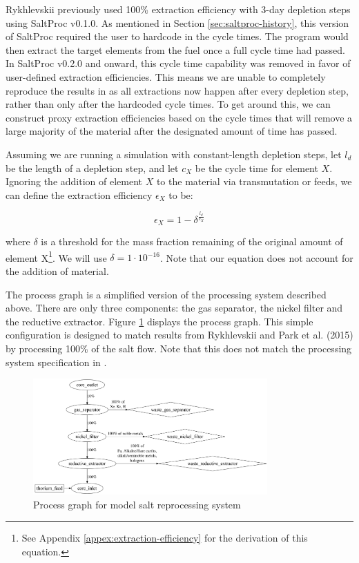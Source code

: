 Rykhlevskii previously used 100\% extraction efficiency with 3-day depletion
steps \cite{rykhlevskii_modeling_2019} using SaltProc v0.1.0. As mentioned in
Section \ref{sec:saltproc-history}, this version of SaltProc required the user
to hardcode in the cycle times. The program would then extract the target
elements from the fuel once a full cycle time had passed. In SaltProc v0.2.0 and
onward, this cycle time capability was removed in favor of user-defined
extraction efficiencies. This means we are unable to completely reproduce the
results in \cite{rykhlevskii_modeling_2019} as all extractions now happen after
every depletion step, rather than only after the hardcoded cycle times.
To get around this, we can construct proxy extraction efficiencies based on the
cycle times that will remove a large majority of the material after the
designated amount of time has passed.

Assuming we are running a simulation with constant-length depletion steps, let
$l_{d}$ be the length of a depletion step, and let $c_{X}$ be the cycle time for
element $X$. Ignoring the addition of element $X$ to the material via
transmutation or feeds, we can define the extraction efficiency $\epsilon_{X}$
to be:

\begin{equation}
    \label{eq:extraction-efficiency}
    \epsilon_{X} = 1 - \delta^{\frac{l_{d}}{c_{X}}}
\end{equation}

where $\delta$ is a threshold for the mass fraction remaining of the original
amount of element X\footnote{See Appendix \ref{appex:extraction-efficiency} for
the derivation of this equation.}. We will use $\delta = 1\cdot 10^{-16}$. Note
that our equation does not account for the addition of material.

The process graph is a simplified version of the processing system described 
above. There are only three components: the gas separator, the nickel filter and
the reductive extractor. Figure \ref{fig:process-graph} displays the process
graph. This simple configuration is designed to match results from Rykhlevskii
and Park et al. (2015) \cite{park_whole_2015} by processing 100\% of the salt
flow. Note that this does not match the processing system specification in
\cite{robertson_conceptual_1971}.

\begin{figure}[htpb]
    \centering
    \includegraphics[width=0.8\textwidth]{figs/ch4/process_graph.png}
    \caption{Process graph for model salt reprocessing system}
    \label{fig:process-graph}
\end{figure}

